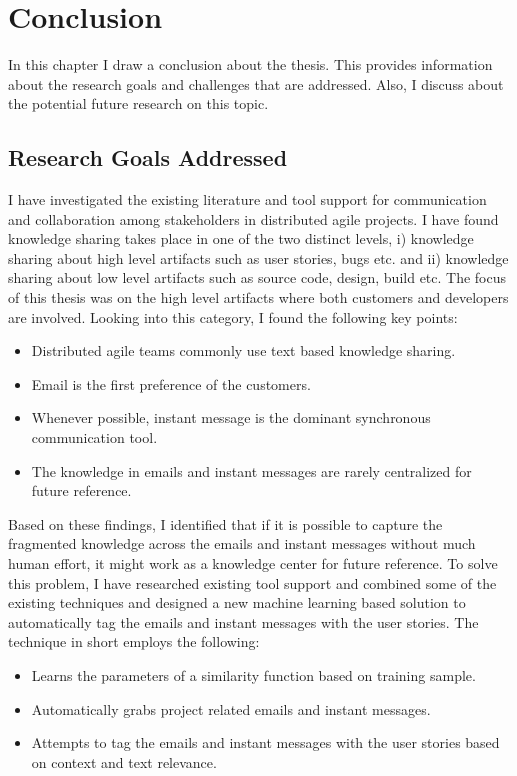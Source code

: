 \fancyhead[RO,LE]{\thepage}
\fancyfoot{} 
\chapter{Conclusion} 
In this chapter I draw a conclusion about the thesis. This provides information about the research goals and challenges that are addressed. Also, I discuss about the potential future research on this topic.

\section{Research Goals Addressed}
I have investigated the existing literature and tool support for communication and collaboration among stakeholders in distributed agile projects. I have found knowledge sharing takes place in one of the two distinct levels, i) knowledge sharing about high level artifacts such as user stories, bugs etc. and ii) knowledge sharing about low level artifacts such as source code, design, build etc. The focus of this thesis was on the high level artifacts where both customers and developers are involved. Looking into this category, I found the following key points:
\begin{itemize}
	\item Distributed agile teams commonly use text based knowledge sharing.
	\item Email is the first preference of the customers.
	\item Whenever possible, instant message is the dominant synchronous communication tool.	
	\item The knowledge in emails and instant messages are rarely centralized for future reference.
\end{itemize}

Based on these findings, I identified that if it is possible to capture the fragmented knowledge across the emails and instant messages without much human effort, it might work as a knowledge center for future reference. To solve this problem, I have researched existing tool support and combined some of the existing techniques and designed a new machine learning based solution to automatically tag the emails and instant messages with the user stories. The technique in short employs the following:
\begin{itemize}
	\item Learns the parameters of a similarity function based on training sample.
	\item Automatically grabs project related emails and instant messages.
	\item Attempts to tag the emails and instant messages with the user stories based on context and text relevance.
\end{itemize}

